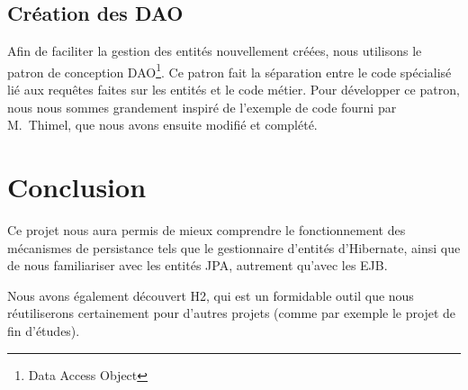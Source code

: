\documentclass[a4paper, french, 11pt]{report}
\begin{document}
\section{Création des DAO}
Afin de faciliter la gestion des entités nouvellement créées, nous utilisons le patron de conception DAO\footnote{Data Access Object}.
Ce patron fait la séparation entre le code spécialisé lié aux requêtes faites sur les entités et le code métier.
Pour développer ce patron, nous nous sommes grandement inspiré de l'exemple de code fourni par M.~Thimel, que nous avons ensuite modifié et complété.

\chapter{Conclusion}
Ce projet nous aura permis de mieux comprendre le fonctionnement des mécanismes de persistance tels que le gestionnaire d'entités d'Hibernate, ainsi que de nous familiariser avec les entités JPA, autrement qu'avec les EJB. 

Nous avons également découvert H2, qui est un formidable outil que nous réutiliserons certainement pour d'autres projets (comme par exemple le projet de fin d'études).
\end{document}
